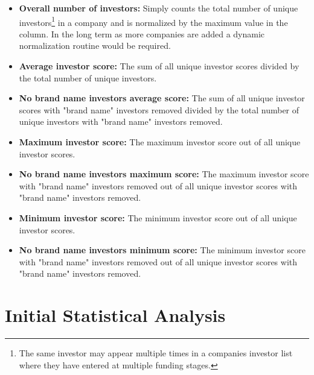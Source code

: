 \documentclass{article}
\begin{document}
\begin{itemize}
	\item\textbf{Overall number of investors:} Simply counts the total number of unique investors\footnote{The same investor may appear multiple times in a companies investor list where they have entered at multiple funding stages.} in a company and is normalized by the maximum value in the column. In the long term as more companies are added a dynamic normalization routine would be required.
	\item\textbf{Average investor score:} The sum of all unique investor scores divided by the total number of unique investors.
	
	\item\textbf{No brand name investors average score:} The sum of all unique investor scores with "brand name" investors removed divided by the total number of unique investors with "brand name" investors removed.
	
	\item\textbf{Maximum investor score:} The maximum investor score out of all unique investor scores.
	
	\item\textbf{No brand name investors maximum score:} The maximum investor score with "brand name" investors removed out of all unique investor scores with "brand name" investors removed.
	
	\item\textbf{Minimum investor score:} The minimum investor score out of all unique investor scores.
	
	\item\textbf{No brand name investors minimum score:} The minimum investor score with "brand name" investors removed out of all unique investor scores with "brand name" investors removed.

\end{itemize}


\section{Initial Statistical Analysis}
\label{sec:finitial_statistical_analysis}
\end{document}
